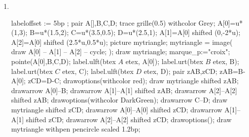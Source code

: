 \begin{corrige}
\begin{changemargin}{-15mm}{0mm}
\begin{multicols}{2}
\begin{enumerate}
\begin{Geometrie}[CoinHD={(4u,4u)}]
                \end{Geometrie}
                \columnbreak
                \item \phantom{rrr}\\
                \begin{Geometrie}[CoinHD={(4u,4u)}]
                    labeloffset := 5bp ;
                    pair A[],B,C,D;
                    trace grille(0.5) withcolor Grey;
                    A[0]=u*(1,3);
                    B=u*(1.5,2);
                    C=u*(3.5,0.5);
                    D=u*(2.5,1);
                    A[1]=A[0] shifted (0,-2*u);
                    A[2]=A[0] shifted (2.5*u,0.5*u);
                    picture mytriangle;
                    mytriangle = image( 
                        draw A[0] -- A[1] -- A[2] -- cycle;
                    );
                    draw mytriangle;
                    marque_p:="croix";
                    pointe(A[0],B,C,D);
                    label.ulft(btex $A$ etex, A[0]);
                    label.urt(btex $B$ etex, B);
                    label.urt(btex $C$ etex, C);
                    label.ulft(btex $D$ etex, D);
                    pair zAB,zCD;
                    zAB=B-A[0];
                    zCD=D-C;
                    drawoptions(withcolor red);
                    draw mytriangle shifted zAB;
                    drawarrow A[0]--B;
                    drawarrow A[1]--A[1] shifted zAB;
                    drawarrow A[2]--A[2] shifted zAB;
                    drawoptions(withcolor DarkGreen);
                    drawarrow C--D;
                    draw mytriangle shifted zCD;
                    drawarrow A[0]--A[0] shifted zCD;
                    drawarrow A[1]--A[1] shifted zCD;
                    drawarrow A[2]--A[2] shifted zCD;
                    drawoptions();
                    draw mytriangle withpen pencircle scaled 1.2bp;                                        
                \end{Geometrie}
            \end{enumerate}
        \end{multicols}    
    \end{changemargin}
\end{corrige}

